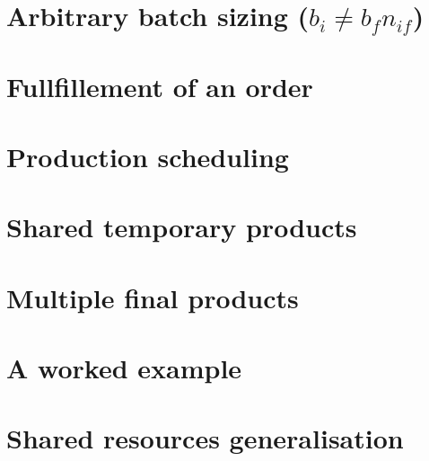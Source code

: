 \documentclass{report}
\begin{document}
    \chapter{Arbitrary batch sizing ($b_i \ne b_fn_{if}$)}
    

    \chapter{Fullfillement of an order}
    

    \chapter{Production scheduling}
    

    \chapter{Shared temporary products}
    

    \chapter{Multiple final products}
    

    \chapter{A worked example}
    

    \chapter{Shared resources generalisation}
    

    \tableofcontents %
\end{document}
